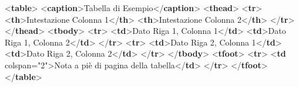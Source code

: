\documentclass[italian,a4paper]{article}
\newenvironment{Shaded}{}{}
\newcommand{\DataTypeTok}[1]{\textcolor[rgb]{0.56,0.13,0.00}{#1}}
\newcommand{\KeywordTok}[1]{\textcolor[rgb]{0.00,0.44,0.13}{\textbf{#1}}}
\newcommand{\NormalTok}[1]{#1}
\newcommand{\OperatorTok}[1]{\textcolor[rgb]{0.40,0.40,0.40}{#1}}
\newcommand{\OtherTok}[1]{\textcolor[rgb]{0.00,0.44,0.13}{#1}}
\newcommand{\StringTok}[1]{\textcolor[rgb]{0.25,0.44,0.63}{#1}}
\begin{document}
\begin{Shaded}
\begin{Highlighting}[]
\DataTypeTok{\textless{}}\KeywordTok{table}\DataTypeTok{\textgreater{}}
  \DataTypeTok{\textless{}}\KeywordTok{caption}\DataTypeTok{\textgreater{}}\NormalTok{Tabella di Esempio}\DataTypeTok{\textless{}/}\KeywordTok{caption}\DataTypeTok{\textgreater{}}
  \DataTypeTok{\textless{}}\KeywordTok{thead}\DataTypeTok{\textgreater{}}
    \DataTypeTok{\textless{}}\KeywordTok{tr}\DataTypeTok{\textgreater{}}
      \DataTypeTok{\textless{}}\KeywordTok{th}\DataTypeTok{\textgreater{}}\NormalTok{Intestazione Colonna 1}\DataTypeTok{\textless{}/}\KeywordTok{th}\DataTypeTok{\textgreater{}}
      \DataTypeTok{\textless{}}\KeywordTok{th}\DataTypeTok{\textgreater{}}\NormalTok{Intestazione Colonna 2}\DataTypeTok{\textless{}/}\KeywordTok{th}\DataTypeTok{\textgreater{}}
    \DataTypeTok{\textless{}/}\KeywordTok{tr}\DataTypeTok{\textgreater{}}
  \DataTypeTok{\textless{}/}\KeywordTok{thead}\DataTypeTok{\textgreater{}}
  \DataTypeTok{\textless{}}\KeywordTok{tbody}\DataTypeTok{\textgreater{}}
    \DataTypeTok{\textless{}}\KeywordTok{tr}\DataTypeTok{\textgreater{}}
      \DataTypeTok{\textless{}}\KeywordTok{td}\DataTypeTok{\textgreater{}}\NormalTok{Dato Riga 1, Colonna 1}\DataTypeTok{\textless{}/}\KeywordTok{td}\DataTypeTok{\textgreater{}}
      \DataTypeTok{\textless{}}\KeywordTok{td}\DataTypeTok{\textgreater{}}\NormalTok{Dato Riga 1, Colonna 2}\DataTypeTok{\textless{}/}\KeywordTok{td}\DataTypeTok{\textgreater{}}
    \DataTypeTok{\textless{}/}\KeywordTok{tr}\DataTypeTok{\textgreater{}}
    \DataTypeTok{\textless{}}\KeywordTok{tr}\DataTypeTok{\textgreater{}}
      \DataTypeTok{\textless{}}\KeywordTok{td}\DataTypeTok{\textgreater{}}\NormalTok{Dato Riga 2, Colonna 1}\DataTypeTok{\textless{}/}\KeywordTok{td}\DataTypeTok{\textgreater{}}
      \DataTypeTok{\textless{}}\KeywordTok{td}\DataTypeTok{\textgreater{}}\NormalTok{Dato Riga 2, Colonna 2}\DataTypeTok{\textless{}/}\KeywordTok{td}\DataTypeTok{\textgreater{}}
    \DataTypeTok{\textless{}/}\KeywordTok{tr}\DataTypeTok{\textgreater{}}
  \DataTypeTok{\textless{}/}\KeywordTok{tbody}\DataTypeTok{\textgreater{}}
  \DataTypeTok{\textless{}}\KeywordTok{tfoot}\DataTypeTok{\textgreater{}}
    \DataTypeTok{\textless{}}\KeywordTok{tr}\DataTypeTok{\textgreater{}}
      \DataTypeTok{\textless{}}\KeywordTok{td}\OtherTok{ colspan}\OperatorTok{=}\StringTok{"2"}\DataTypeTok{\textgreater{}}\NormalTok{Nota a piè di pagina della tabella}\DataTypeTok{\textless{}/}\KeywordTok{td}\DataTypeTok{\textgreater{}}
    \DataTypeTok{\textless{}/}\KeywordTok{tr}\DataTypeTok{\textgreater{}}
  \DataTypeTok{\textless{}/}\KeywordTok{tfoot}\DataTypeTok{\textgreater{}}
\DataTypeTok{\textless{}/}\KeywordTok{table}\DataTypeTok{\textgreater{}}
\end{Highlighting}
\end{Shaded}
\end{document}
